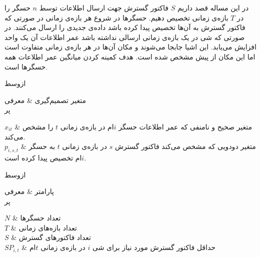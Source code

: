 

در این مساله قصد داریم $S$ فاکتور گسترش جهت ارسال اطلاعات توسط $n$ حسگر را در $T$ بازه‌ی زمانی تخصیص دهیم.
حسگرها در شروع هر بازه‌ی زمانی در صورتی که فاکتور گسترش به آن‌ها تخصیص پیدا کرده باشد داده‌ی جدیدی را ارسال می‌کنند.
در صورتی که شی در یک بازه‌ی زمانی ارسالی نداشته باشد عمر اطلاعات آن یک واحد افزایش می‌یابد.
این اشیا جابجا می‌شوند و مکان آن‌ها در هر بازه‌ی زمانی متفاوت است اما این مکان از پیش مشخص شده است.
هدف کمینه کردن میانگین عمر اطلاعات همه حسگر‌ها است.


‌ازوسط



متغیر تصمیم‌گیری & معرفی \\

‌پر

$x_{it}$ & متغیر صحیح و نامنفی که عمر اطلاعات حسگر $i$ام در بازه‌ی زمانی $t$ را مشخص می‌کند. \\

$p_{i,s,t}$ & متغیر دودویی که مشخص می‌کند فاکتور گسترش $s$ در بازه‌ی زمانی $t$ به حسگر $i$ام تخصیص پیدا کرده است. \\





‌ازوسط



پارامتر & معرفی \\

‌پر

$N$ & تعداد حسگرها \\

$T$ & تعداد بازه‌های زمانی \\

$S$ & تعداد فاکتورهای گسترش \\

$SP_{i, t}$ & حداقل فاکتور گسترش مورد نیاز برای شی $i$ در بازه‌ی زمانی $t$ام \\




